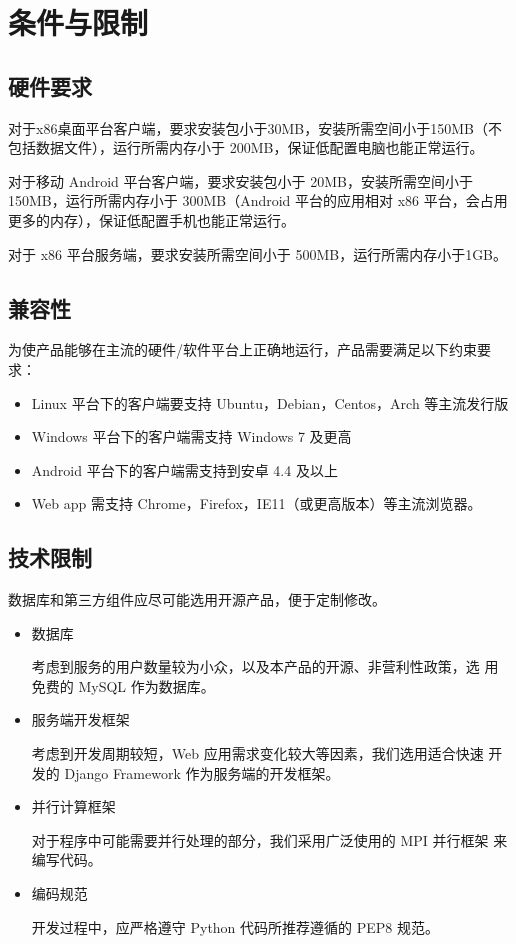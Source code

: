 \section{条件与限制}
\subsection{硬件要求}
对于x86桌面平台客户端，要求安装包小于30MB，安装所需空间小于150MB（不包括数据文件），运行所需内存小于 200MB，保证低配置电脑也能正常运行。

对于移动 Android 平台客户端，要求安装包小于 20MB，安装所需空间小于150MB，运行所需内存小于 300MB（Android 平台的应用相对 x86 平台，会占用
更多的内存），保证低配置手机也能正常运行。

对于 x86 平台服务端，要求安装所需空间小于 500MB，运行所需内存小于1GB。

\subsection{兼容性}
为使产品能够在主流的硬件/软件平台上正确地运行，产品需要满足以下约束要求：
\begin{itemize}
\item Linux 平台下的客户端要支持 Ubuntu，Debian，Centos，Arch 等主流发行版
\item Windows 平台下的客户端需支持 Windows 7 及更高
\item Android 平台下的客户端需支持到安卓 4.4 及以上
\item Web app 需支持 Chrome，Firefox，IE11（或更高版本）等主流浏览器。
\end{itemize}

\subsection{技术限制}
数据库和第三方组件应尽可能选用开源产品，便于定制修改。

\begin{itemize}
\item 数据库

考虑到服务的用户数量较为小众，以及本产品的开源、非营利性政策，选
用免费的 MySQL 作为数据库。
\item 服务端开发框架

考虑到开发周期较短，Web 应用需求变化较大等因素，我们选用适合快速
开发的 Django Framework 作为服务端的开发框架。
\item 并行计算框架

对于程序中可能需要并行处理的部分，我们采用广泛使用的 MPI 并行框架
来编写代码。
\item 编码规范

开发过程中，应严格遵守 Python 代码所推荐遵循的 PEP8 规范。
\end{itemize}







